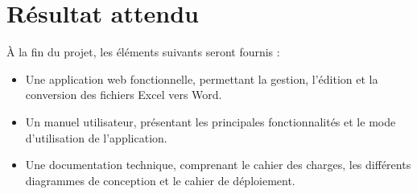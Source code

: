 \chapter{Résultat attendu}

À la fin du projet, les éléments suivants seront fournis :

\begin{itemize}
    \item Une application web fonctionnelle, permettant la gestion, l'édition et la conversion des fichiers Excel vers Word.
    \item Un manuel utilisateur, présentant les principales fonctionnalités et le mode d'utilisation de l'application.
    \item Une documentation technique, comprenant le cahier des charges, les différents diagrammes de conception et le cahier de déploiement.
\end{itemize}

